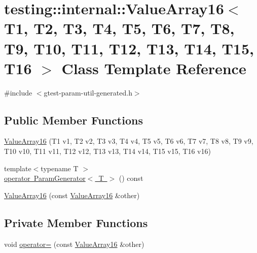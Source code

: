 \hypertarget{classtesting_1_1internal_1_1_value_array16}{}\section{testing\+::internal\+::Value\+Array16$<$ T1, T2, T3, T4, T5, T6, T7, T8, T9, T10, T11, T12, T13, T14, T15, T16 $>$ Class Template Reference}
\label{classtesting_1_1internal_1_1_value_array16}


{\ttfamily \#include $<$gtest-\/param-\/util-\/generated.\+h$>$}

\subsection*{Public Member Functions}
\begin{DoxyCompactItemize}
\item 
\mbox{\hyperlink{classtesting_1_1internal_1_1_value_array16_ac12b3a15ab5418665a97b4a225438529}{Value\+Array16}} (T1 v1, T2 v2, T3 v3, T4 v4, T5 v5, T6 v6, T7 v7, T8 v8, T9 v9, T10 v10, T11 v11, T12 v12, T13 v13, T14 v14, T15 v15, T16 v16)
\item 
{\footnotesize template$<$typename T $>$ }\\\mbox{\hyperlink{classtesting_1_1internal_1_1_value_array16_ae4f1174da079ca0d674497f5e452274c}{operator Param\+Generator$<$ T $>$}} () const
\item 
\mbox{\hyperlink{classtesting_1_1internal_1_1_value_array16_a867f767c90905de55a8b4933881d144b}{Value\+Array16}} (const \mbox{\hyperlink{classtesting_1_1internal_1_1_value_array16}{Value\+Array16}} \&other)
\end{DoxyCompactItemize}
\subsection*{Private Member Functions}
\begin{DoxyCompactItemize}
\item 
void \mbox{\hyperlink{classtesting_1_1internal_1_1_value_array16_af4e10f252d7b51b140bbebc4b22d6cf9}{operator=}} (const \mbox{\hyperlink{classtesting_1_1internal_1_1_value_array16}{Value\+Array16}} \&other)
\end{DoxyCompactItemize}
